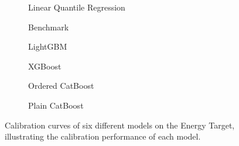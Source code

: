 \begin{figure}[htbp]
    \centering
    \begin{subfigure}[b]{0.5\textwidth}
        \centering
        
        \caption{Linear Quantile Regression}
        \label{fig:small-orfe-calibration-energy}
    \end{subfigure}%
    \begin{subfigure}[b]{0.5\textwidth}
        \centering
        
        \caption{Benchmark}
        \label{fig:armed-play-calibration-energy}
    \end{subfigure}
    
    \begin{subfigure}[b]{0.5\textwidth}
        \centering
        
        \caption{LightGBM}
        \label{fig:mangy-flux-calibration-energy}
    \end{subfigure}%
    \begin{subfigure}[b]{0.5\textwidth}
        \centering
        
        \caption{XGBoost}
        \label{fig:couth-ruby-calibration-energy}
    \end{subfigure}
    
    \begin{subfigure}[b]{0.5\textwidth}
        \centering
        
        \caption{Ordered CatBoost}
        \label{fig:civil-leas-calibration-energy}
    \end{subfigure}%
    \begin{subfigure}[b]{0.5\textwidth}
        \centering
        
        \caption{Plain CatBoost}
        \label{fig:blear-dita-calibration-energy}
    \end{subfigure}
    
    \caption{Calibration curves of six different models on the Energy Target, illustrating the calibration performance of each model.}
    \label{fig:energy_calibration}
\end{figure}

